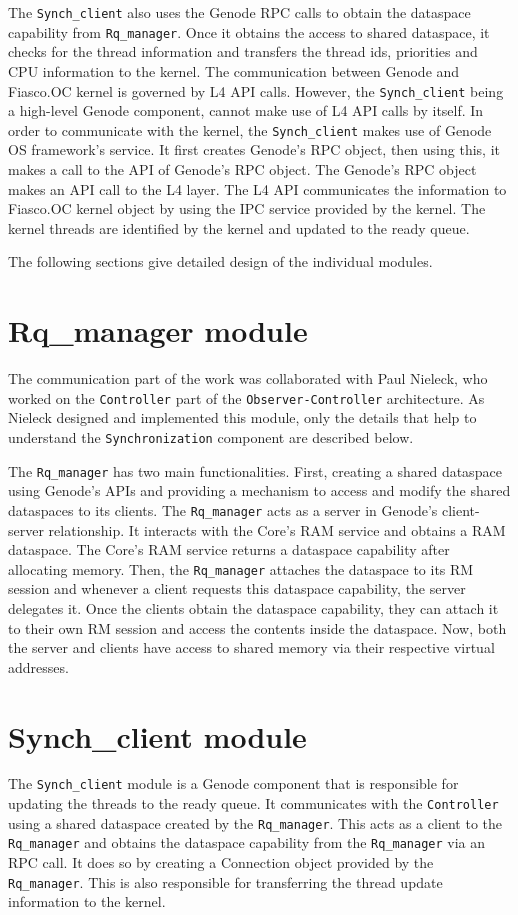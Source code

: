 The \texttt{Synch\_client} also uses the Genode RPC calls to obtain the dataspace capability from \texttt{Rq\_manager}. Once it obtains the access to shared dataspace, it checks for the thread information and transfers the thread ids, priorities and CPU information to the kernel. The communication between Genode and Fiasco.OC kernel is governed by L4 API calls. However, the \texttt{Synch\_client} being a high-level Genode component, cannot make use of L4 API calls by itself. In order to communicate with the kernel, the \texttt{Synch\_client} makes use of Genode OS framework's service. It first creates Genode's RPC object, then using this, it makes a call to the API of Genode's RPC object. The Genode's RPC object makes an API call to the L4 layer. The L4 API communicates the information to Fiasco.OC kernel object by using the IPC service provided by the kernel. The kernel threads are identified by the kernel and updated to the ready queue.

The following sections give detailed design of the individual modules.

\section{Rq\_manager module}\label{rqmodule}
The communication part of the work was collaborated with Paul Nieleck, who worked on the \texttt{Controller} part of the \texttt{Observer-Controller} architecture\cite{paul}. As Nieleck designed and implemented this module, only the details that help to understand the \texttt{Synchronization} component are described below. 

The \texttt{Rq\_manager} has two main functionalities. First, creating a shared dataspace using Genode's APIs and providing a mechanism to access and modify the shared dataspaces to its clients. The \texttt{Rq\_manager} acts as a server in Genode's client-server relationship. It interacts with the Core's RAM service and obtains a RAM dataspace. The Core’s RAM service returns a dataspace capability after allocating memory. Then, the \texttt{Rq\_manager} attaches the dataspace to its RM session and whenever a client requests this dataspace capability, the server delegates it. Once the clients obtain the dataspace capability, they can attach it to their own RM session and access the contents inside the dataspace. Now, both the server and clients have access to shared memory via their respective virtual addresses.

\section{Synch\_client module}
The \texttt{Synch\_client} module is a Genode component that is responsible for updating the threads to the ready queue. It communicates with the \texttt{Controller} using a shared dataspace created by the \texttt{Rq\_manager}. This acts as a client to the \texttt{Rq\_manager} and obtains the dataspace capability from the \texttt{Rq\_manager} via an RPC call. It does so by creating a Connection object provided by the \texttt{Rq\_manager}. This is also responsible for transferring the thread update information to the kernel.


